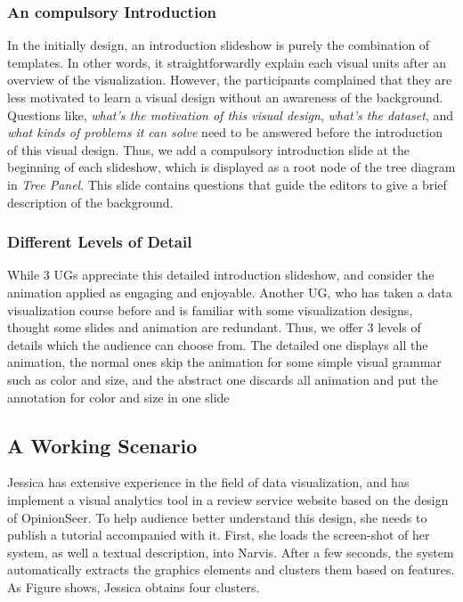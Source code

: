 \subsubsection{An compulsory Introduction}
In the initially design, an introduction slideshow is purely the combination of templates. In other words, it straightforwardly explain each visual units after an overview of the visualization. However, the participants complained that they are less motivated to learn a visual design without an awareness of the background. Questions like, \textit{what's the motivation of this visual design}, \textit{what's the dataset}, and \textit{what kinds of problems it can solve} need to be answered before the introduction of this visual design. Thus, we add a compulsory introduction slide at the beginning of each slideshow, which is displayed as a root node of the tree diagram in \textit{Tree Panel}. This slide contains questions that guide the editors to give a brief description of the background.
\subsubsection{Different Levels of Detail}
While 3 UGs appreciate this detailed introduction slideshow, and consider the animation applied as engaging and enjoyable. Another UG, who has taken a data visualization course before and is familiar with some visualization designs, thought some slides and animation are redundant. 
Thus, we offer 3 levels of details which the audience can choose from. The detailed one displays all the animation, the normal ones skip the animation for some simple visual grammar such as color and size, and the abstract one discards all animation and put the annotation for color and size in one slide
    
\subsection{A Working Scenario}
Jessica has extensive experience in the field of data visualization, and has implement a visual analytics tool in a review service website based on the design of OpinionSeer\cite{wu_opinionseer:_2010}. To help audience better understand this design, she needs to publish a tutorial accompanied with it.
First, she loads the screen-shot of her system, as well a textual description, into Narvis.
After a few seconds, the system automatically extracts the graphics elements and clusters them based on features. As Figure shows, Jessica obtains four clusters. 

